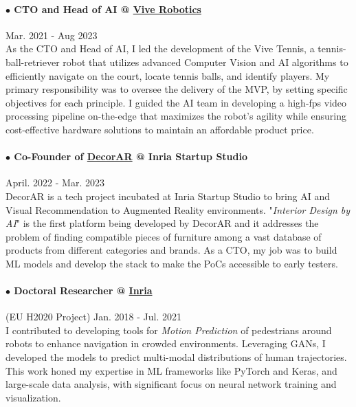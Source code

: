 \documentclass[10pt]{res}
\begin{document}
\begin{resume}
\paragraph{$\bullet$ CTO and Head of AI @ \href{http://vivetennis.com} {Vive Robotics}} \hfill Mar. 2021 - Aug 2023\\
As the CTO and Head of AI, I led the development of the Vive Tennis, a tennis-ball-retriever robot that utilizes advanced Computer Vision and AI algorithms to efficiently navigate on the court, locate tennis balls, and identify players. My primary responsibility was to oversee the delivery of the MVP, by setting specific objectives for each principle. I guided the AI team in developing a high-fps video processing pipeline on-the-edge that maximizes the robot's agility while ensuring cost-effective hardware solutions to maintain an affordable product price.
\vspace{-14pt}

\paragraph{$\bullet$ Co-Founder of \href{http://decorar.ai} {DecorAR} @ Inria Startup Studio} \hfill April. 2022 - Mar. 2023\\
DecorAR is a tech project incubated at Inria Startup Studio to bring AI and Visual Recommendation to Augmented Reality environments. "\textit{Interior Design by AI}" is the first platform being developed by DecorAR and it addresses the problem of finding compatible pieces of furniture among a vast database of products from different categories and brands. As a CTO, my job was to build ML models and develop the stack to make the PoCs accessible to early testers.
\vspace{-14pt}

\paragraph{$\bullet$ Doctoral Researcher @ \href{http://inria.fr} {Inria}} (EU H2020 Project) \hfill Jan. 2018 - Jul. 2021\\
I contributed to developing tools for \textit{Motion Prediction} of pedestrians around robots to enhance navigation in crowded environments. Leveraging GANs, I developed the models to predict multi-modal distributions of human trajectories. This work honed my expertise in ML frameworks like PyTorch and Keras, and large-scale data analysis, with significant focus on neural network training and visualization.
\vspace{-14pt}


\end{resume}
\end{document}
